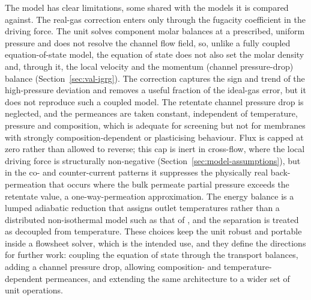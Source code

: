 \documentclass[a4paper,fleqn]{cas-dc}
\begin{document}
The model has clear limitations, some shared with the models it is compared
against. The real-gas correction enters only through the fugacity coefficient in
the driving force. The unit solves component molar balances at a prescribed,
uniform pressure and does not resolve the channel flow field, so, unlike a fully
coupled equation-of-state model, the equation of state does not also set the molar
density and, through it, the local velocity and the momentum (channel
pressure-drop) balance (Section~\ref{sec:val-igrg}). The correction captures the
sign and trend of the high-pressure deviation and removes a useful fraction of the
ideal-gas error, but it does not reproduce such a coupled model. The retentate channel
pressure drop is neglected, and the permeances are taken constant, independent of
temperature, pressure and composition, which is adequate for screening but not
for membranes with strongly composition-dependent or plasticising behaviour. Flux
is capped at zero rather than allowed to reverse; this cap is inert in cross-flow,
where the local driving force is structurally non-negative
(Section~\ref{sec:model-assumptions}), but in the co- and counter-current patterns
it suppresses the physically real back-permeation that occurs where the bulk
permeate partial pressure exceeds the retentate value, a one-way-permeation
approximation. The
energy balance is a lumped adiabatic reduction that assigns outlet temperatures
rather than a distributed non-isothermal model such as that of
\citet{fontoura2022}, and the separation is treated as decoupled from
temperature. These choices keep the unit robust and portable inside a flowsheet
solver, which is the intended use, and they define the directions for further
work: coupling the equation of state through the transport balances, adding a
channel pressure drop, allowing composition- and temperature-dependent
permeances, and extending the same architecture to a wider set of unit
operations.

\end{document}
